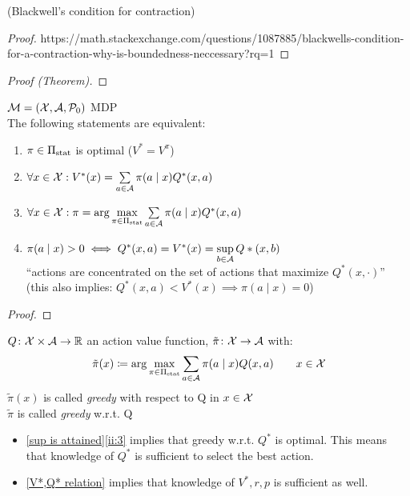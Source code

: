 \begin{lemma}(Blackwell's condition for contraction)
\end{lemma}

\begin{proof}
https://math.stackexchange.com/questions/1087885/blackwells-condition-for-a-contraction-why-is-boundedness-neccessary?rq=1
\end{proof}

\begin{proof}[Proof (Theorem)]
\end{proof}


\begin{prop}\label{sup is attained}\(\mathcal{M}=(\mathcal{X},\mathcal{A},\mathcal{P}_0)\) MDP\\
The following statements are equivalent:
\begin{enumerate}[label={(\roman*)},font=\normalfont]
\item \(\pi \in\Pi_{\textnormal{stat}}\) is optimal (\(V^*=V^\pi\))
\item \(\forall x\in\mathcal{X}: V^*(x)=\sum\limits_{a\in\mathcal{A}}\pi(a\mid x)Q^*(x,a)\)
\item\label{ii:3} \(\forall x\in\mathcal{X}: \pi=\arg\max\limits_{\pi\in\Pi_{\textnormal{stat}}}\sum\limits_{a\in\mathcal{A}}\pi(a\mid x)Q^*(x,a) \)
\item \(\pi(a\mid x)>0 \iff Q^*(x,a)=V^*(x) =\sup\limits_{b\in\mathcal{A}}Q*(x,b)\) \\
	``actions are concentrated on the set of actions that maximize \(Q^*(x,\cdot)\)''\\
	(this also implies: \(Q^*(x,a)<V^*(x) \implies \pi(a\mid x)=0\))
\end{enumerate}
\end{prop}

\begin{proof}
\end{proof}


\begin{definition}
	\(Q\colon\mathcal{X}\times\mathcal{A}\to\mathbb{R}\) an action value function, \(\tilde{\pi}\colon\mathcal{X}\to\mathcal{A}\) with:
	\[
	\tilde{\pi}(x)\coloneqq\arg\max_{\pi\in\Pi_{\textnormal{stat}}}\sum_{a\in\mathcal{A}}\pi(a\mid x) Q(x,a)\qquad x\in\mathcal{X}
	\]
	\(\tilde{\pi}(x)\) is called \emph{greedy} with respect to Q in \(x\in\mathcal{X}\)\\
	\(\tilde{\pi}\) is called \emph{greedy} w.r.t. Q
\end{definition}


\begin{remark}\leavevmode
	\begin{itemize}
	\item \ref{sup is attained}\ref{ii:3} implies that greedy w.r.t. \(Q^*\) is optimal. 
	This means that knowledge of \(Q^*\) is sufficient to select the best action.
	\item \ref{V*,Q* relation} implies that knowledge of \(V^*,r,p\) is sufficient as well.
	\end{itemize}
\end{remark}
\endinput
